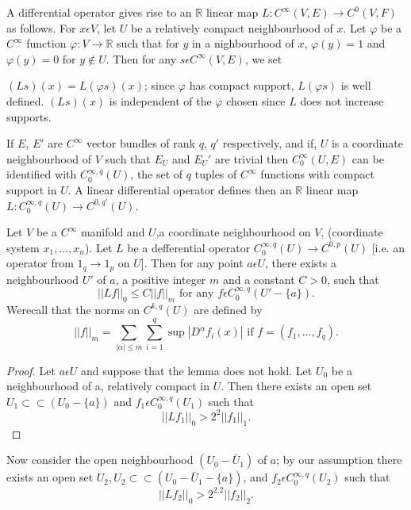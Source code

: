 \begin{remarks*}%
  A differential operator gives rise to an $\mathbb{R}$ linear map $L
  : C^\infty (V, E) \to C^0 (V, F)$ as follows. For $x \epsilon V$,
  let $U$ be a relatively compact neighbourhood of $x$. Let $\varphi$
  be a $C^\infty$ function $\varphi : V \to \mathbb{R}$ such that for
  $y$ in a nighbourhood of $x$, $\varphi (y) = 1$ and $\varphi (y) = 0
  $ for $y \notin U$. Then for any $s \epsilon C^\infty (V, E)$, we
  set 
  
  $(Ls)(x) = L (\varphi s) (x)$; since $\varphi$ has compact support,
  $L (\varphi s)$ is well defined. $(Ls)(x)$ is independent of the
  $\varphi$ chosen since $L$ does not increase supports.  
\end{remarks*}

If $E$, $E'$ are $C^\infty$ vector bundles of rank $q$, $q'$
respectively, and if, $U$ is a coordinate neighbourhood of $V$ such
that $E_U$ and $E_U'$ are trivial then $C^\infty_0 (U, E)$ can be
identified with $C^{\infty, q}_0 (U)$, the set of $q$ tuples of
$C^\infty$ functions with compact support in $U$. A linear
differential operator defines then an $\mathbb{R}$ linear map
$L:C^{\infty,q}_0 (U) \to C^{0,q'} (U)$. 

\setcounter{lemma}{0}
\begin{lemma}\label{chap3:sec2:lem1}%
  Let $V$ be a $C^\infty$ manifold and $U$,a coordinate neighbourhood
  on $V$, (coordinate system $x_1 ,\ldots,x_n$). Let $L$ be a
  defferential operator $C^{\infty,q}_0 (U) \to  C^{0,p} (U)$ [i.e. an
    operator from  $1_q \to 1_p$ on $U$]. Then for any point $a
  \epsilon U$, there exists a neighbourhood $U'$ of $a$, a positive
  integer $m$ and a constant $C > 0$, such that   
  $$
  || Lf ||_0 \le  C || f||_m \text{ for any } f \epsilon
  C_0^{\infty,q} (U'-\{a\}). 
  $$
  We\pageoriginale recall that the norms on $C^{k,q} (U)$ are defined by
  $$
  || f ||_m = \sum_{|\alpha| \le m} \sum^q_{i=1} \sup |D^\alpha f_i
  (x)| \text{ if } f = (f_1 ,\ldots,f_q). 
  $$
\end{lemma}

\begin{proof}
  Let $a \epsilon U$ and suppose that the lemma does not hold. Let
  $U_0$ be a neighbourhood of a, relatively compact in $U$. Then there
  exists an open set $U_1 \subset \subset (U_0 - \{a\})$ and $f_1
  \epsilon C^{\infty,q}_0 (U_1)$ such that 
  $$
  ||Lf_1||_0 > 2^2 || f_1||_1.
  $$
\end{proof}

Now consider the open neighbourhood $(U_0 - \bar{U}_1)$ of $a$; by our
assumption there exists an open set $U_2,U_2 \subset \subset (U_0 -
\bar{U}_1 - \{a\})$, and $f_2 \epsilon C^{\infty,q}_0 (U_2)$ such
that 
$$
||Lf_2||_0 > 2^{2.2} ||f_2||_2. 
$$

